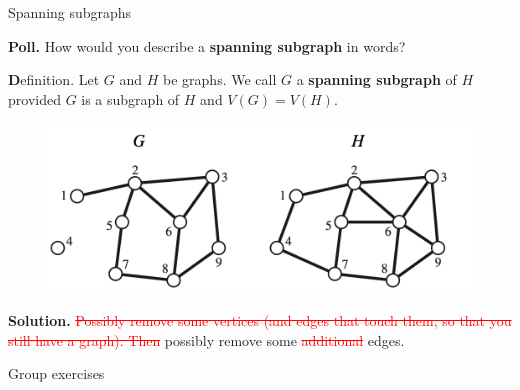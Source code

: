 \documentclass[10pt]{beamer}
\begin{document}
\begin{frame}{Spanning subgraphs}


\colorbox{yellow!30}{\textbf{Poll.}} How would you describe a \textbf{spanning subgraph} in words?
\vfill 
\pause 

\colorbox{green!30}{\textbf Definition.} Let $G$ and $H$ be graphs.  We call $G$ a \textbf{spanning subgraph} of $H$ provided $G$ is a subgraph of $H$ and $V(G)=V(H)$.
\vfill
\pause 
\begin{mygreenbox}[title=\text{Example: G is a \textbf{spanning subgraph} of H}]
\begin{figure}
\includegraphics[width=.8\textwidth]{images/subgraph_spanning.png}
\end{figure}	
\end{mygreenbox}
\vfill 
\pause 
\colorbox{red!30}{\textbf{Solution.}} \textcolor{red}{\sout{ Possibly remove some vertices (and edges that touch them, so that you still have a graph). Then}}	 possibly remove some \textcolor{red}{\sout{additional}} edges.
\end{frame}


\begin{frame}[standout]
Group exercises
\end{frame}
\end{document}
